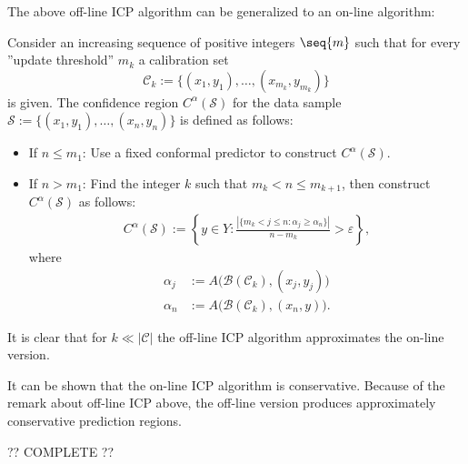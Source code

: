     The above off-line ICP algorithm can be generalized to an on-line algorithm:
    \begin{construct}
        Consider an increasing sequence of positive integers $\seq{m}$ such that for every ''update threshold'' $m_k$ a calibration set \[\mathcal{C}_k:=\{(x_1, y_1),\ldots,(x_{m_k}, y_{m_k})\}\] is given. The confidence region $C^\alpha(\mathcal{S})$ for the data sample $\mathcal{S}:=\{(x_1, y_1),\ldots,(x_n, y_n)\}$ is defined as follows:
        \begin{itemize}
            \item If $n\leq m_1$: Use a fixed conformal predictor to construct $C^\alpha(\mathcal{S})$.
            \item If $n>m_1$: Find the integer $k$ such that $m_k<n\leq m_{k+1}$, then construct $C^\alpha(\mathcal{S})$ as follows:
            \begin{gather}
                C^\alpha(\mathcal{S}) := \left\{y\in Y:\frac{|\{m_k<j\leq n:\alpha_j\geq\alpha_n\}|}{n-m_k}>\varepsilon\right\},
            \end{gather}
            where
            \begin{align*}
                \alpha_j &:= A\big(\mathcal{B}(\mathcal{C}_k), (x_j, y_j)\big)\\
                \alpha_n &:= A\big(\mathcal{B}(\mathcal{C}_k), (x_n, y)\big).
            \end{align*}
        \end{itemize}
        It is clear that for $k\ll|\mathcal{C}|$ the off-line ICP algorithm approximates the on-line version.
    \end{construct}

    \begin{property}[Validity]
        It can be shown that the on-line ICP algorithm is conservative. Because of the remark about off-line ICP above, the off-line version produces approximately conservative prediction regions.
    \end{property}

    ?? COMPLETE ??